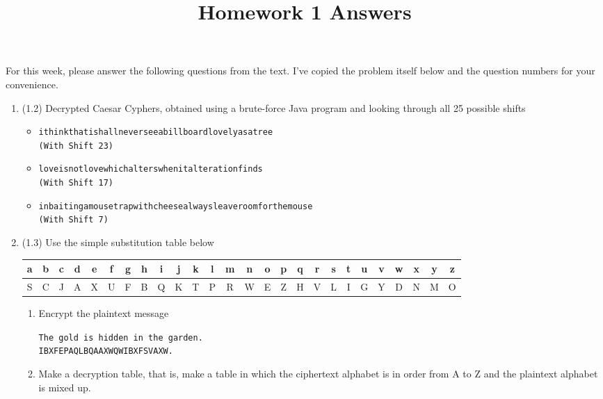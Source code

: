 \documentclass[12pt]{amsart}
\theoremstyle{definition}
\begin{document}
\title{Homework 1 Answers}

\maketitle

For this week, please answer the following questions from the text. 
I've copied the problem itself below and the question numbers for 
your convenience. 

\begin{enumerate}
	\item (1.2) Decrypted Caesar Cyphers, obtained using a brute-force Java program and looking through all 25 possible shifts
		\begin{itemize}
			\item \texttt{ithinkthatishallneverseeabillboardlovelyasatree\\(With Shift 23)}
			\item \texttt{loveisnotlovewhichalterswhenitalterationfinds\\(With Shift 17)}
			\item \texttt{inbaitingamousetrapwithcheesealwaysleaveroomforthemouse\\(With Shift 7)}
		\end{itemize}
	\item (1.3) Use the simple substitution table below
	\begin{center}
		\begin{tabular}{|c |c |c |c |c |c |c |c |c |c |c |c |c |c |c |c |c |c |c |c |c |c |c |c| c| c|}
			\hline
			a & b & c & d & e & f & g & h & i & j & k & l & m & n & o & 
			p & q & r & s & t & u & v & w & x & y & z \\
			\hline
			S & C & J & A & X & U & F & B & Q & K & T & P & R & W & E & 
			Z & H & V & L & I & G & Y & D & N & M & O \\
			\hline
		\end{tabular}
	\end{center}
	\begin{enumerate}
		\item Encrypt the plaintext message
		\begin{center}
			\texttt{The gold is hidden in the garden.} \\
			\texttt{IBXFEPAQLBQAAXWQWIBXFSVAXW.}
		\end{center}
		\item Make a decryption table, that is, make a table in which the ciphertext 
			alphabet is in order from A to Z and the plaintext alphabet is mixed up.\\

\end{enumerate}
\end{enumerate}
\end{document}
